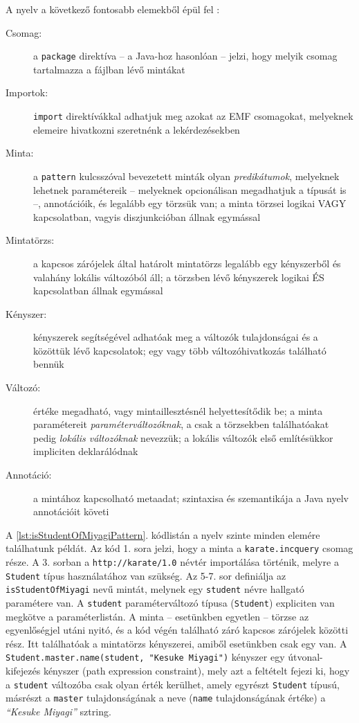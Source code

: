 A nyelv a következő fontosabb elemekből épül fel \cite{EclipseOrgIncQueryLang}:
\begin{description}
\item[Csomag:] a \texttt{package} direktíva -- a Java-hoz hasonlóan -- jelzi, hogy melyik csomag tartalmazza a fájlban lévő mintákat
\item[Importok:] \texttt{import} direktívákkal adhatjuk meg azokat az \gls{EMF} csomagokat, melyeknek elemeire hivatkozni szeretnénk a lekérdezésekben
\item[Minta:] a \texttt{pattern} kulcsszóval bevezetett minták olyan \emph{predikátumok}, melyeknek lehetnek paramétereik -- melyeknek opcionálisan megadhatjuk a típusát is --, annotációik, és legalább egy törzsük van; a minta törzsei logikai VAGY kapcsolatban, vagyis diszjunkcióban állnak egymással
\item[Mintatörzs:] a kapcsos zárójelek által határolt mintatörzs legalább egy kényszerből és valahány lokális változóból áll; a törzsben lévő kényszerek logikai ÉS kapcsolatban állnak egymással 
\item[Kényszer:] kényszerek segítségével adhatóak meg a változók tulajdonságai és a közöttük lévő kapcsolatok; egy vagy több változóhivatkozás található bennük
\item[Változó:] értéke megadható, vagy mintaillesztésnél helyettesítődik be; a minta paramétereit \emph{paraméterváltozóknak}, a csak a törzsekben találhatóakat pedig \emph{lokális változóknak} nevezzük; a lokális változók első említésükkor impliciten deklarálódnak
\item[Annotáció:] a mintához kapcsolható metaadat; szintaxisa és szemantikája a Java nyelv annotációit követi
\end{description}

A \ref{lst:isStudentOfMiyagiPattern}. kódlistán a nyelv szinte minden elemére találhatunk példát.
Az kód 1. sora jelzi, hogy a minta a \texttt{karate.incquery} csomag része.
A 3. sorban a \texttt{http://karate/1.0} névtér importálása történik, melyre a \texttt{Student} típus használatához van szükség.
Az 5-7. sor definiálja az \texttt{isStudentOfMiyagi} nevű mintát, melynek egy \texttt{student} névre hallgató paramétere van.
A \texttt{student} paraméterváltozó típusa (\texttt{Student}) expliciten van megkötve a paraméterlistán.
A minta -- esetünkben egyetlen -- törzse az egyenlőségjel utáni nyitó, és a kód végén található záró kapcsos zárójelek közötti rész.
Itt találhatóak a mintatörzs kényszerei, amiből esetünkben csak egy van.
A \texttt{Student.master.name(student, "Kesuke Miyagi")} kényszer egy útvonal-kifejezés kényszer (path expression constraint), mely azt a feltételt fejezi ki, hogy a \texttt{student} változóba csak olyan érték kerülhet, amely egyrészt \texttt{Student} típusú, másrészt a \texttt{master} tulajdonságának a neve (\texttt{name} tulajdonságának értéke) a \textit{``Kesuke Miyagi''} sztring.

